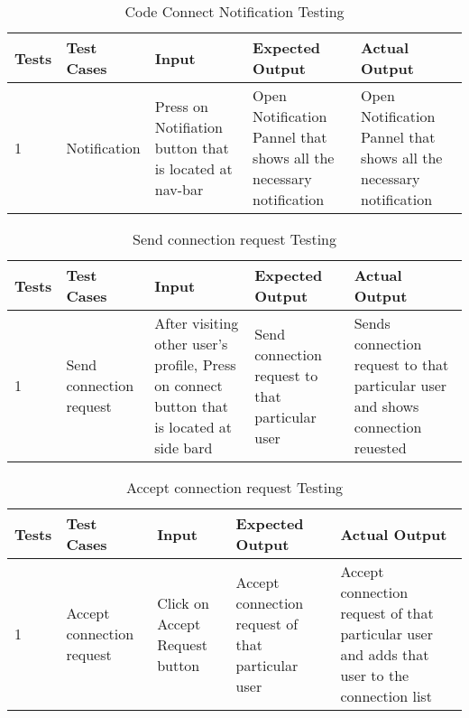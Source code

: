 \begin{table}[H]
    \caption{Code Connect Notification Testing}
        \label{}
    \begin{tabular}{|p{0.3in}|p{1.2in}|p{1.2in}|p{1.2in}|p{1in}|}
        \hline
        Tests & Test Cases & Input &Expected Output & Actual Output \\
        \hline
            1 &Notification & Press on Notifiation button that is located at nav-bar &Open Notification Pannel that shows all the necessary notification &Open Notification Pannel that shows all the necessary notification \\
            \hline
\end{tabular}
\end{table}
\begin{table}[H]
    \caption{Send connection request Testing}
        \label{}
    \begin{tabular}{|p{0.3in}|p{1.2in}|p{1.2in}|p{1.2in}|p{1in}|}
        \hline
        Tests & Test Cases & Input &Expected Output & Actual Output \\
        \hline
            1 &Send connection request & After visiting other user's profile, Press on connect button that is located at side bard  &Send connection request to that particular user &Sends connection request to that particular user and shows connection reuested \\
            \hline
\end{tabular}
\end{table}

\begin{table}[H]
    \caption{Accept connection request Testing}
        \label{}
    \begin{tabular}{|p{0.3in}|p{1.2in}|p{1.2in}|p{1.2in}|p{1in}|}
        \hline
        Tests & Test Cases & Input &Expected Output & Actual Output \\
        \hline
            1 &Accept connection request & Click on Accept Request button &Accept connection request of that particular user &Accept connection request of that particular user and adds that user to the connection list \\
            \hline
\end{tabular}
\end{table}

